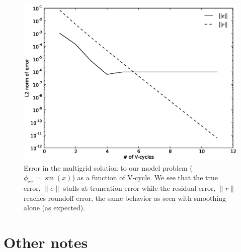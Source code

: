 \begin{figure}
\centering
\includegraphics[width=5.5in]{mg_error_vs_cycle}
\caption[Error in solution as a function of multigrid V-cycle
  number.]{\label{fig:mgerror} Error in the multigrid solution to our
  model problem ($\phi_{xx} = \sin(x)$) as a function of V-cycle.  We
  see that the true error, $\|e\|$ stalls at truncation error while
  the residual error, $\|r\|$ reaches roundoff error, the same
  behavior as seen with smoothing alone (as expected).}
\end{figure}


\section{Other notes}

